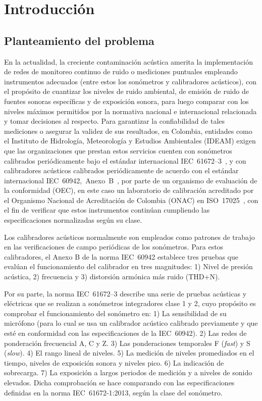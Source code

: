 \chapter{Introducción}


\section{Planteamiento del problema}
En la actualidad, la creciente contaminación acústica amerita la implementación de redes de monitoreo continuo de ruido
o mediciones puntuales empleando instrumentos adecuados (entre estos los sonómetros y calibradores acústicos), con el
propósito de cuantizar los niveles de ruido ambiental, de emisión de ruido de fuentes sonoras específicas y de
exposición sonora, para luego comparar con los niveles máximos permitidos por la normativa nacional e internacional
relacionada y tomar decisiones al respecto.
Para garantizar la confiabilidad de tales mediciones o asegurar la validez de sus resultados, en Colombia, entidades
como el Instituto de Hidrología, Meteorología y Estudios Ambientales (IDEAM) exigen que las organizaciones que prestan
estos servicios cuenten con sonómetros calibrados periódicamente bajo el estándar internacional
\mbox{IEC 61672--3}~\citeyearpar{IEC_TC29_2013_3}, y con calibradores acústicos calibrados periódicamente de acuerdo con
el estándar internacional \mbox{IEC 60942, Anexo B}~\citeyearpar{IEC_TC29_2017}, por parte de un organismo de evaluación
de la conformidad (OEC), en este caso un laboratorio de calibración acreditado por el Organismo Nacional de Acreditación
de Colombia (ONAC) en \mbox{ISO 17025}~\citeyearpar{ISO_CASCO_2017}, con el fin de verificar que estos instrumentos
continúan cumpliendo las especificaciones normalizadas según su clase.

Los calibradores acústicos normalmente son empleados como patrones de trabajo en las verificaciones de campo periódicas
de los sonómetros.
Para estos calibradores, el Anexo B de la norma \mbox{IEC 60942} establece tres pruebas que evalúan el funcionamiento
del calibrador en tres magnitudes:
1) Nivel de presión acústica,
2) frecuencia y
3) distorsión armónica más ruido (THD+N).

Por su parte, la norma \mbox{IEC 61672--3} describe una serie de pruebas acústicas y eléctricas que se realizan a
sonómetros integradores clase 1 y 2, cuyo propósito es comprobar el funcionamiento del sonómetro en:
1) La sensibilidad de su micrófono (para lo cual se usa un calibrador acústico calibrado previamente y que esté en
conformidad con las especificaciones de la \mbox{IEC 60942}).
2) Las redes de ponderación frecuencial A, C y Z. 3) Las ponderaciones temporales F (\emph{fast}) y S (\emph{slow}).
4) El rango lineal de niveles.
5) La medición de niveles promediados en el tiempo, niveles de exposición sonora y niveles pico.
6) La indicación de sobrecarga.
7) La exposición a largos periodos de medición y a niveles de sonido elevados.
Dicha comprobación se hace comparando con las especificaciones definidas en la norma \mbox{IEC 61672-1:2013}, según la
clase del sonómetro.

